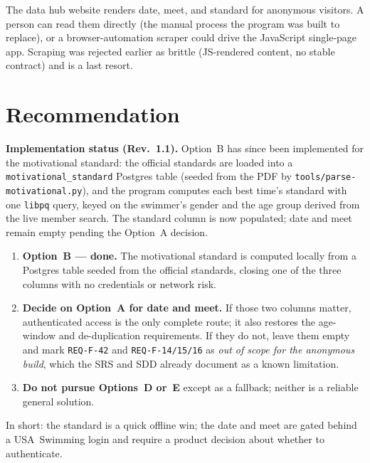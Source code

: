 \documentclass[12pt]{article}
\newcommand{\code}[1]{\texttt{#1}}
\begin{document}
The data hub website renders date, meet, and standard for anonymous
visitors. A person can read them directly (the manual process the program
was built to replace), or a browser-automation scraper could drive the
JavaScript single-page app. Scraping was rejected earlier as brittle
(JS-rendered content, no stable contract) and is a last resort.

\section{Recommendation}

\textbf{Implementation status (Rev.~1.1).} Option~B has since been
implemented for the motivational standard: the official standards are loaded
into a \code{motivational\_standard} Postgres table (seeded from the PDF by
\code{tools/parse-motivational.py}), and the program computes each best
time's standard with one \code{libpq} query, keyed on the swimmer's gender
and the age group derived from the live member search. The standard column
is now populated; date and meet remain empty pending the Option~A decision.

\begin{enumerate}[leftmargin=1.6em]
  \item \textbf{Option~B --- done.} The motivational standard is computed
        locally from a Postgres table seeded from the official standards,
        closing one of the three columns with no credentials or network risk.
  \item \textbf{Decide on Option~A for date and meet.} If those two columns
        matter, authenticated access is the only complete route; it also
        restores the age-window and de-duplication requirements. If they do
        not, leave them empty and mark \code{REQ-F-42} and \code{REQ-F-14/15/16}
        as \emph{out of scope for the anonymous build}, which the SRS and SDD
        already document as a known limitation.
  \item \textbf{Do not pursue Options~D or~E} except as a fallback; neither
        is a reliable general solution.
\end{enumerate}

\medskip
\noindent In short: the standard is a quick offline win; the date and meet
are gated behind a USA~Swimming login and require a product decision about
whether to authenticate.
\end{document}
